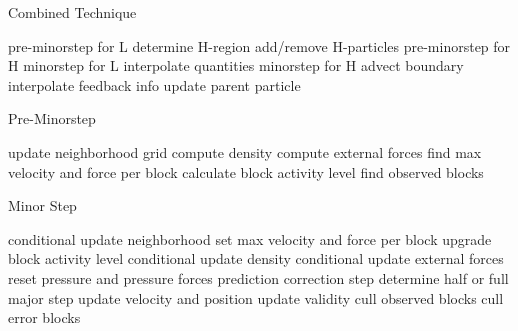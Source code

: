 \documentclass[../../main.tex]{subfiles}
\begin{document}
\label{la:1}
\label{la:2}
\label{la:3}
\label{la:4}

\begin{algorithm}
    \caption{Combined Technique}
    \label{alg:twoscale}
    \begin{algorithmic}[1]
            \State pre-minorstep for L
            \State determine H-region
            \State add/remove H-particles
            \State pre-minorstep for H
                \State minorstep for L
                \State interpolate quantities
                  \State minorstep for H
                  \State advect boundary
                \EndFor
            \State interpolate feedback info
            \EndFor
            \State update parent particle
        \EndWhile
   \end{algorithmic}
\end{algorithm}

\begin{algorithm}
    \caption{Pre-Minorstep}
    \label{alg:twoscale}
    \begin{algorithmic}[1]
    \State update neighborhood grid
    \State compute density
    \State compute external forces
    \State find max velocity and force per block
    \State calculate block activity level
    \State find observed blocks
   \end{algorithmic}
\end{algorithm}

\begin{algorithm}
    \caption{Minor Step}
    \label{alg:twoscale}
    \begin{algorithmic}[1]
        \State conditional update neighborhood 
    \EndIf 
    \State set max velocity and force per block
    \State upgrade block activity level
        \State conditional update density 
        \State conditional update external forces 
    \EndIf 
    \State reset pressure and pressure forces
    \State prediction correction step
    \State determine half or full major step
    \State update velocity and position
    \State update validity
    \State cull observed blocks
	\State cull error blocks
   \end{algorithmic}
\end{algorithm}
\end{document}
